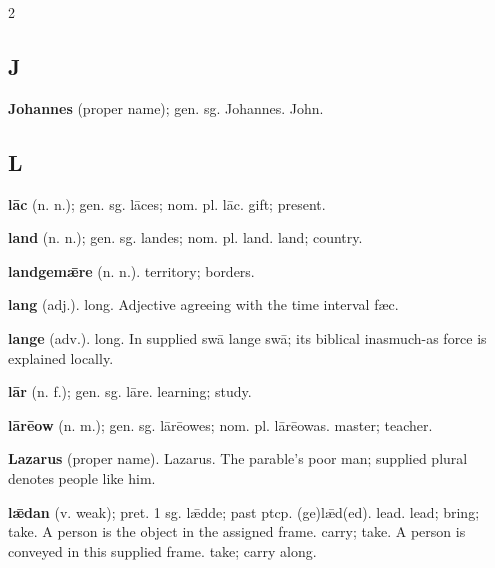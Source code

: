 \begin{multicols*}{2}
\subsection*{J}
\textbf{Johannes} (proper name); gen. sg. Johannes. John.\par
\subsection*{L}
\textbf{lāc} (n. n.); gen. sg. lāces; nom. pl. lāc. gift; present.\par
\textbf{land} (n. n.); gen. sg. landes; nom. pl. land. land; country.\par
\textbf{landgemǣre} (n. n.). territory; borders.\par
\textbf{lang} (adj.). long. Adjective agreeing with the time interval fæc.\par
\textbf{lange} (adv.). long. In supplied swā lange swā; its biblical inasmuch-as force is explained locally.\par
\textbf{lār} (n. f.); gen. sg. lāre. learning; study.\par
\textbf{lārēow} (n. m.); gen. sg. lārēowes; nom. pl. lārēowas. master; teacher.\par
\textbf{Lazarus} (proper name). Lazarus. The parable's poor man; supplied plural denotes people like him.\par
\textbf{lǣdan} (v. weak); pret. 1 sg. lǣdde; past ptcp. (ge)lǣd(ed). lead. lead; bring; take. A person is the object in the assigned frame. carry; take. A person is conveyed in this supplied frame. take; carry along.\par

\end{multicols*}
